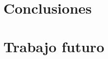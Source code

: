 \documentclass[a4paper,12pt]{article}
\begin{document}
\newpage
\section{Conclusiones} \label{sec:conclusiones}



\newpage

\section{Trabajo futuro} \label{sec:conclusiones}

\newpage






\appendix
\end{document}
